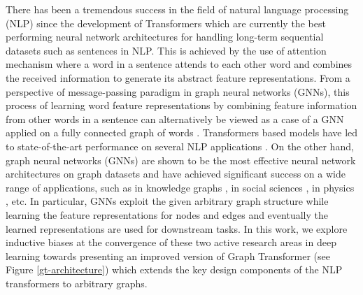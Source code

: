 \documentclass[letterpaper]{article}
\begin{document}
\noindent There has been a tremendous success in the field of natural language processing (NLP) since the development of Transformers \cite{vaswani2017attention} which are currently the best performing neural network architectures for handling long-term sequential datasets such as sentences in NLP. This is achieved by the use of attention mechanism \cite{bahdanau2014neural} where a word in a sentence attends to each other word and combines the received information to generate its abstract feature representations. From a perspective of message-passing paradigm \cite{gilmer2017neural} in graph neural networks (GNNs), this process of learning word feature representations by combining feature information from other words in a sentence can alternatively be viewed as a case of a GNN applied on a fully connected graph of words \cite{joshi2020transformers}. Transformers based models have led to state-of-the-art performance on several NLP applications \cite{devlin2018bert, radford2018improving, brown2020language}.
On the other hand, graph neural networks (GNNs) are shown to be the most effective neural network architectures on graph datasets and have achieved significant success on a wide range of applications, such as in knowledge graphs \cite{schlichtkrull2018modeling,chami2020low}, in social sciences \cite{monti2019fake}, in physics \cite{cranmer2019learning,sanchez2020learning}, etc. In particular, GNNs exploit the given arbitrary graph structure while learning the feature representations for nodes and edges and eventually the learned representations are used for downstream tasks. In this work, we explore inductive biases at the convergence of these two active research areas in deep learning towards presenting an improved version of Graph Transformer (see Figure \ref{gt-architecture}) which extends the key design components of the NLP transformers to arbitrary graphs.
\end{document}
